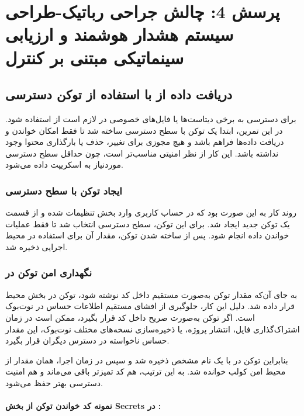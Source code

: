\documentclass{article}
\begin{document}
\section{پرسش 4: چالش جراحی رباتیک-طراحی سیستم هشدار هوشمند و ارزیابی سینماتیکی مبتنی بر کنترل }
\subsection{دریافت داده از  با استفاده از توکن دسترسی}

برای دسترسی به برخی دیتاست‌ها یا فایل‌های خصوصی در  لازم است از  استفاده شود. در این تمرین، ابتدا یک توکن با سطح دسترسی  ساخته شد تا فقط امکان خواندن و دریافت داده‌ها فراهم باشد و هیچ مجوزی برای تغییر، حذف یا بارگذاری محتوا وجود نداشته باشد. این کار از نظر امنیتی مناسب‌تر است، چون حداقل سطح دسترسی موردنیاز به اسکریپت داده می‌شود.

\subsubsection{ایجاد توکن با سطح دسترسی }

روند کار به این صورت بود که در حساب کاربری  وارد بخش تنظیمات شده و از قسمت  یک توکن جدید ایجاد شد. برای این توکن، سطح دسترسی  انتخاب شد تا فقط عملیات خواندن داده انجام شود. پس از ساخته شدن توکن، مقدار آن برای استفاده در محیط اجرایی ذخیره شد.

\subsubsection{نگهداری امن توکن در }

به جای آن‌که مقدار توکن به‌صورت مستقیم داخل کد نوشته شود، توکن در بخش  محیط  قرار داده شد. دلیل این کار، جلوگیری از افشای مستقیم اطلاعات حساس در نوت‌بوک است. اگر توکن به‌صورت صریح داخل کد قرار بگیرد، ممکن است در زمان اشتراک‌گذاری فایل، انتشار پروژه، یا ذخیره‌سازی نسخه‌های مختلف نوت‌بوک، این مقدار حساس ناخواسته در دسترس دیگران قرار بگیرد.

بنابراین توکن در  با یک نام مشخص ذخیره شد و سپس در زمان اجرا، همان مقدار از محیط امن کولب خوانده شد. به این ترتیب، هم کد تمیزتر باقی می‌ماند و هم امنیت دسترسی بهتر حفظ می‌شود.

\paragraph{نمونه کد خواندن توکن از بخش Secrets در :}
\end{document}
